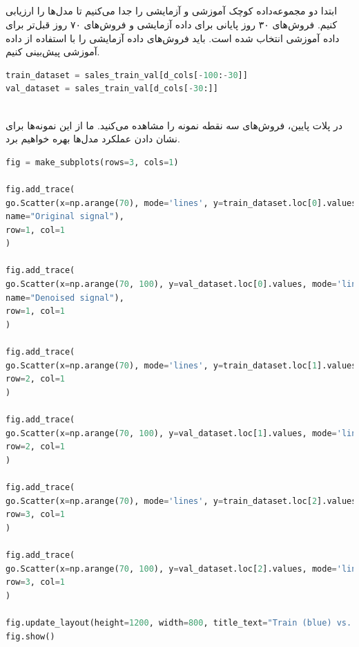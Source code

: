 \documentclass{article}
\begin{document}
\subsection*{}
ابتدا دو مجموعه‌داده کوچک آموزشی و آزمایشی را جدا می‌کنیم تا مدل‌ها را ارزیابی کنیم. فروش‌های ۳۰ روز پایانی برای داده آزمایشی و فروش‌های ۷۰ روز قبل‌تر برای داده‌ آموزشی انتخاب شده است. باید فروش‌های داده‌ آزمایشی را با استفاده از داده آموزشی پیش‌بینی کنیم.
\begin{latin}
\begin{lstlisting}[language=Python]
train_dataset = sales_train_val[d_cols[-100:-30]]
val_dataset = sales_train_val[d_cols[-30:]]
\end{lstlisting}
\end{latin}
\ \\
در پلات پایین، فروش‌های سه نقطه نمونه را مشاهده می‌کنید. ما از این نمونه‌ها برای نشان دادن عملکرد مدل‌ها بهره خواهیم برد.
\begin{latin}
\begin{lstlisting}[language=Python]
fig = make_subplots(rows=3, cols=1)

fig.add_trace(
go.Scatter(x=np.arange(70), mode='lines', y=train_dataset.loc[0].values, marker=dict(color="dodgerblue"), showlegend=False,
name="Original signal"),
row=1, col=1
)

fig.add_trace(
go.Scatter(x=np.arange(70, 100), y=val_dataset.loc[0].values, mode='lines', marker=dict(color="darkorange"), showlegend=False,
name="Denoised signal"),
row=1, col=1
)

fig.add_trace(
go.Scatter(x=np.arange(70), mode='lines', y=train_dataset.loc[1].values, marker=dict(color="dodgerblue"), showlegend=False),
row=2, col=1
)

fig.add_trace(
go.Scatter(x=np.arange(70, 100), y=val_dataset.loc[1].values, mode='lines', marker=dict(color="darkorange"), showlegend=False),
row=2, col=1
)

fig.add_trace(
go.Scatter(x=np.arange(70), mode='lines', y=train_dataset.loc[2].values, marker=dict(color="dodgerblue"), showlegend=False),
row=3, col=1
)

fig.add_trace(
go.Scatter(x=np.arange(70, 100), y=val_dataset.loc[2].values, mode='lines', marker=dict(color="darkorange"), showlegend=False),
row=3, col=1
)

fig.update_layout(height=1200, width=800, title_text="Train (blue) vs. Validation (orange) sales")
fig.show()
\end{lstlisting}
\end{latin}
\end{document}
